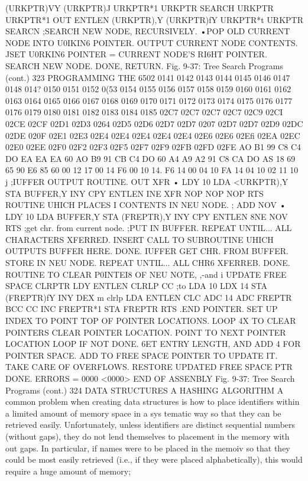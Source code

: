 {{{{{{{{{{{{{{{{{{{{{{{{{{{{{{{{{{{{{{{{{{{{{{{{{{{{{{{{{{{(URKPTR)VY
(URKPTR)J
URKPTR*1
URKPTR
SEARCH
URKPTR
URKPTR*1
OUT
ENTLEN
(URKPTR),Y
(URKPTR)fY
URKPTR*t
URKPTR
SEARCN
;SEARCH NEW NODE, RECURSIVELY.
•POP OLD CURRENT NODE INTO U0IKIN6 POINTER.
{OUTPUT CURRENT NODE CONTENTS.
JSET U0RKIN6 POINTER =
{CURRENT NODE'S RI6HT POINTER.
{SEARCH NEW NODE.
{DONE, RETURN.
Fig. 9-37: Tree Search Programs (cont.)
323
PROGRAMMING THE 6502
0141
0142
0143
0144
0145
0146
0147
0148
014?
0150
0151
0152
0(53
0154
0155
0156
0157
0158
0159
0160
0161
0162
0163
0164
0165
0166
0167
0168
0169
0170
0171
0172
0173
0174
0175
0176
0177
0176
0179
0180
0181
0182
0183
0184
0185
02C7
02C7
02C7
02C7
02C9
02CI
02CE
02CF
02D1
02D3
0264
02D5
02D6
02D7
02D7
0207
02D7
02D7
02D9
02DC
02DE
020F
02E1
02E3
02E4
02E4
02E4
02E4
02E4
02E6
02E6
02Efi
02EA
02EC
02E0
02EE
02F0
02F2
02F3
02F5
02F7
02F9
02FB
02FD
02FE
AO
B1
99
C8
C4
DO
EA
EA
EA
60
AO
B9
91
CB
C4
DO
60
A4
A9
A2
91
C8
CA
DO
AS
18
69
65
90
E6
85
60
00
12
17 00
14
F6
00
10
14.
F6
14
00
04
10
FA
14
04
10
02
11
10
j
;IUFFER OUTPUT ROUTINE.
{
OUT
XFR
•
LDY 10
LDA <URKPTR),Y
STA BUFFER,Y
INY
CPY ENTLEN
INE XFR
NOP
NOP
NOP
RTS
{ROUTINE UHICH PLACES I
{CONTENTS IN NEU NODE.
;
ADD
NOV
•
LDY 10
LDA BUFFER,Y
STA (FREPTR),Y
INY
CPY ENTLEN
8NE NOV
RTS
;get chr. from current node.
;PUT IN BUFFER.
{REPEAT UNTIL...
{ALL CHARACTERS XFERRED.
{INSERT CALL TO SUBROUTINE
{UHICH OUTPUTS BUFFER HERE.
{DONE.
IUFFER
{GET CHR. FROM BUFFER.
{STORE IN NEU NODE.
{REPEAT UNTIL...
{ALL CHR6 XFERREB.
{DONE.
{ROUTINE TO CLEAR P0INTEI8 OF NEU NOTE,
,-and i
{
UPDATE FREE SPACE
CLRPTR LDY ENTLEN
CLRLP
CC
;to
LDA 10
LDX 14
STA (FREPTR)fY
INY
DEX
m clrlp
LDA ENTLEN
CLC
ADC 14
ADC FREPTR
BCC CC
INC FREPTR*1
STA FREPTR
RTS
.END
POINTER.
{SET UP INDEX TO POINT
TOP OF POINTER LOCATIONS.
{LOOP 4X TO CLEAR POINTERS
{CLEAR POINTER LOCATION.
{POINT TO NEXT POINTER LOCATION
{LOOP IF NOT DONE.
{6ET ENTRY LENGTH,
{AND ADD 4 FOR POINTER SPACE.
{ADD TO FREE SPACE POINTER TO
{UPDATE IT.
{TAKE CARE OF OVERFLOWS.
{RESTORE UPDATED FREE SPACE PTR
{DONE.
ERRORS = 0000 <0000>
END OF ASSENBLY
Fig. 9-37: Tree Search Programs (cont.)
324
DATA STRUCTURES
A HASHING ALGORITHM
A common problem when creating data structures is how to place
identifiers within a limited amount of memory space in a sys
tematic way so that they can be retrieved easily. Unfortunately,
unless identifiers are distinct sequential numbers (without gaps),
they do not lend themselves to placement in the memory with
out gaps. In particular, if names were to be placed in the memoiv so
that they could be most easily retrieved (i.e., if they were placed
alphabetically), this would require a huge amount of memory;
}}}}}}}}}}}}}}}}}}}}}}}}}}}}}}}}}}}}}}}}}}}}}}}}}}}}}}}}}}}}}}}}}}}}}}}}}}}}}}}}}}}}}}}}}}
